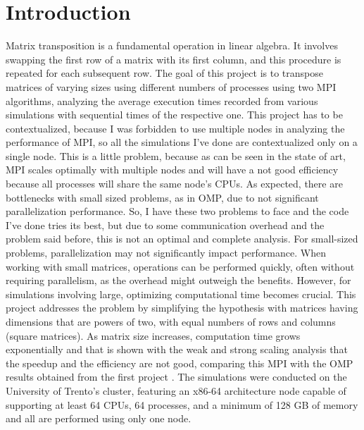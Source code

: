 \section{Introduction}
Matrix transposition is a fundamental operation in linear algebra. It involves swapping the first row of a matrix with its first column, and this procedure is repeated for each subsequent row.
The goal of this project is to transpose matrices of varying sizes using different numbers of processes using two MPI algorithms, analyzing the average execution times recorded from various simulations with sequential times of the respective one.
This project has to be contextualized, because I was forbidden to use multiple nodes in analyzing the performance of MPI, so all the simulations I've done are contextualized only on a single node. This is a little problem, because as can be seen in the state of art, MPI scales optimally with multiple nodes and will have a not good efficiency because all processes will share the same node's CPUs. 
As expected, there are bottlenecks with small sized problems, as in OMP, due to not significant parallelization performance. So, I have these two problems to face and the code I've done tries its best, but due to some communication overhead and the problem said before, this is not an optimal and complete analysis.
For small-sized problems, parallelization may not significantly impact performance. When working with small matrices, operations can be performed quickly, often without requiring parallelism, as the overhead might outweigh the benefits. However, for simulations involving large, optimizing computational time becomes crucial. This project addresses the problem by simplifying the hypothesis with matrices having dimensions that are powers of two, with equal numbers of rows and columns (square matrices).
As matrix size increases, computation time grows exponentially and that is shown with the weak and strong scaling analysis that the speedup and the efficiency are not good, comparing this MPI with the OMP results obtained from the first project \cite{my_first_report}.
The simulations were conducted on the University of Trento's cluster, featuring an x86-64 architecture node capable of supporting at least 64 CPUs, 64 processes, and a minimum of 128 GB of memory and all are performed using only one node. 
